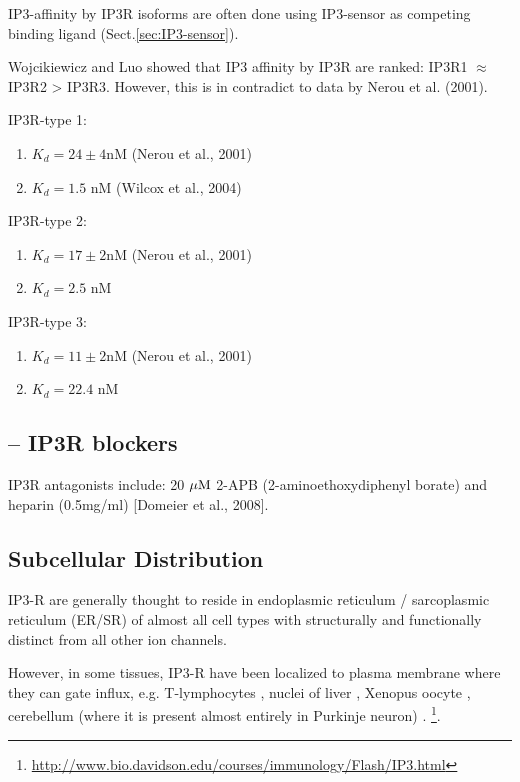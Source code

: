 IP3-affinity by IP3R isoforms are often done using IP3-sensor as competing
binding ligand (Sect.\ref{sec:IP3-sensor}).

Wojcikiewicz and Luo showed that IP3 affinity by IP3R are ranked: IP3R1
$\approx$ IP3R2 > IP3R3. However, this is in contradict to data by Nerou et
al. (2001).

IP3R-type 1: 
\begin{enumerate}
  \item $K_d = 24\pm 4 $nM  (Nerou et al., 2001)
  \item $K_d = 1.5 $ nM (Wilcox et al., 2004)
\end{enumerate}

IP3R-type 2: 
\begin{enumerate}
  \item $K_d = 17\pm 2 $nM (Nerou et al., 2001)
  \item $K_d = 2.5$ nM 
\end{enumerate}

IP3R-type 3: 
\begin{enumerate}
  \item $K_d = 11\pm 2 $nM (Nerou et al., 2001)
  \item $K_d = 22.4$ nM 
\end{enumerate}

\subsection{-- IP3R blockers}
\label{sec:IP3R-blockers}

IP3R antagonists include: 20 ${\mu\text{M}}$ 2-APB (2-aminoethoxydiphenyl borate) and
heparin (0.5mg/ml) [Domeier et al., 2008].

\subsection{Subcellular Distribution}
\label{sec:IP3R-distribution}


IP3-R are generally thought to reside in endoplasmic reticulum / sarcoplasmic
reticulum (ER/SR) of almost all cell types with structurally and functionally
distinct from all other ion channels. 

However, in some tissues, IP3-R have been localized to plasma membrane where
they can gate  influx, e.g. T-lymphocytes \citep{kuno1987, khan1992,
vazquez2002ip3r}, nuclei of liver \citep{nicotera1990}, Xenopus oocyte
\citep{stehno_bittel1994, gerasimenko1995}, cerebellum (where it is present almost entirely in Purkinje
neuron) \citep{joseph1989ip3,joseph1992}.
\footnote{\url{http://www.bio.davidson.edu/courses/immunology/Flash/IP3.html}}.


